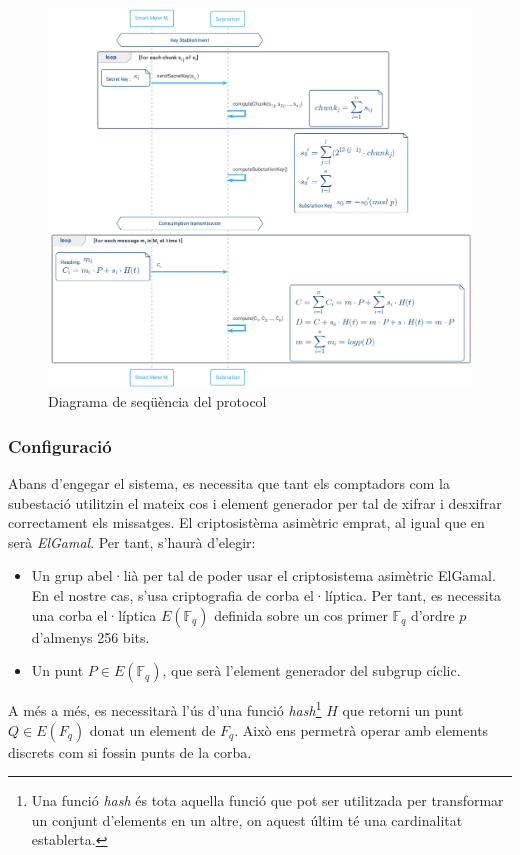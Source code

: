 \documentclass{article}
\begin{document}
\begin{figure}[H]
	\centering
	\includegraphics[width=16cm]{umls/recsi.png}
	\caption{Diagrama de seqüència del protocol \cite{recsi}}
\end{figure}
\subsubsection{Configuració}\label{sec:configuracio-recsi}
Abans d'engegar el sistema, es necessita que tant els comptadors com la subestació utilitzin el mateix cos i element generador per tal de xifrar i desxifrar correctament els missatges. El criptosistèma asimètric emprat, al igual que en \cite{busom} serà \textit{ElGamal}. Per tant, s'haurà d'elegir:
\begin{itemize}
	\item Un grup abel·lià per tal de poder usar el criptosistema asimètric ElGamal. En el nostre cas, s'usa criptografia de corba el·líptica. Per tant, es necessita una corba el·líptica $E(\mathbb{F}_q)$ definida sobre un cos primer $\mathbb{F}_q$ d'ordre $p$ d'almenys 256 bits.
	\item Un punt $P \in E(\mathbb{F}_q)$, que serà l'element generador del subgrup cíclic.
\end{itemize}
A més a més, es necessitarà l'ús d'una funció \textit{hash}\footnote{
Una funció \textit{hash} és tota aquella funció que pot ser utilitzada per transformar un conjunt d'elements en un altre, on aquest últim té una cardinalitat establerta.
}
$H$ que retorni un punt $Q \in E(F_q)$ donat un element de $F_q$. Això ens permetrà operar amb elements discrets com si fossin punts de la corba. 
\end{document}
